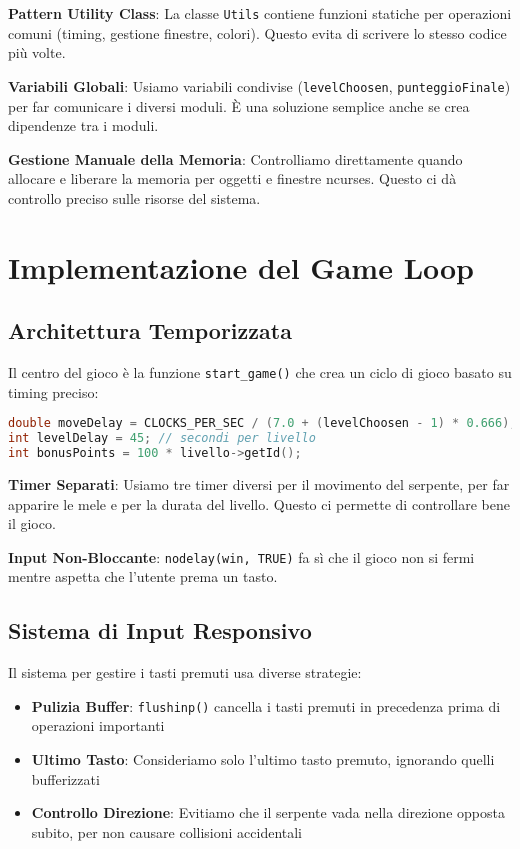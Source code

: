 \documentclass[a4paper,12pt]{article}
\begin{document}
\textbf{Pattern Utility Class}: La classe \texttt{Utils} contiene funzioni statiche per operazioni comuni (timing, gestione finestre, colori). Questo evita di scrivere lo stesso codice più volte.

\textbf{Variabili Globali}: Usiamo variabili condivise (\texttt{levelChoosen}, \texttt{punteggioFinale}) per far comunicare i diversi moduli. È una soluzione semplice anche se crea dipendenze tra i moduli.

\textbf{Gestione Manuale della Memoria}: Controlliamo direttamente quando allocare e liberare la memoria per oggetti e finestre ncurses. Questo ci dà controllo preciso sulle risorse del sistema.

\section{Implementazione del Game Loop}

\subsection{Architettura Temporizzata}

Il centro del gioco è la funzione \texttt{start\_game()} che crea un ciclo di gioco basato su timing preciso:

\begin{lstlisting}[language=C++]
double moveDelay = CLOCKS_PER_SEC / (7.0 + (levelChoosen - 1) * 0.666);
int levelDelay = 45; // secondi per livello
int bonusPoints = 100 * livello->getId();
\end{lstlisting}

\textbf{Timer Separati}: Usiamo tre timer diversi per il movimento del serpente, per far apparire le mele e per la durata del livello. Questo ci permette di controllare bene il gioco.

\textbf{Input Non-Bloccante}: \texttt{nodelay(win, TRUE)} fa sì che il gioco non si fermi mentre aspetta che l'utente prema un tasto.

\subsection{Sistema di Input Responsivo}

Il sistema per gestire i tasti premuti usa diverse strategie:

\begin{itemize}
    \item \textbf{Pulizia Buffer}: \texttt{flushinp()} cancella i tasti premuti in precedenza prima di operazioni importanti
    \item \textbf{Ultimo Tasto}: Consideriamo solo l'ultimo tasto premuto, ignorando quelli bufferizzati
    \item \textbf{Controllo Direzione}: Evitiamo che il serpente vada nella direzione opposta subito, per non causare collisioni accidentali
\end{itemize}
\end{document}
